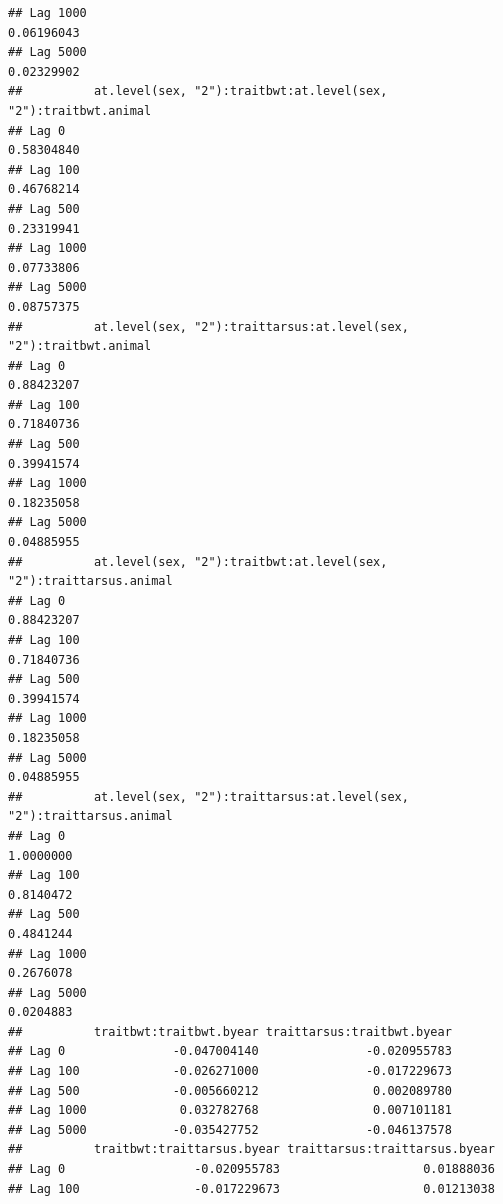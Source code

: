 \documentclass[
  12pt,
]{book}
\begin{document}
\begin{verbatim}
## Lag 1000                                                           0.06196043
## Lag 5000                                                           0.02329902
##          at.level(sex, "2"):traitbwt:at.level(sex, "2"):traitbwt.animal
## Lag 0                                                        0.58304840
## Lag 100                                                      0.46768214
## Lag 500                                                      0.23319941
## Lag 1000                                                     0.07733806
## Lag 5000                                                     0.08757375
##          at.level(sex, "2"):traittarsus:at.level(sex, "2"):traitbwt.animal
## Lag 0                                                           0.88423207
## Lag 100                                                         0.71840736
## Lag 500                                                         0.39941574
## Lag 1000                                                        0.18235058
## Lag 5000                                                        0.04885955
##          at.level(sex, "2"):traitbwt:at.level(sex, "2"):traittarsus.animal
## Lag 0                                                           0.88423207
## Lag 100                                                         0.71840736
## Lag 500                                                         0.39941574
## Lag 1000                                                        0.18235058
## Lag 5000                                                        0.04885955
##          at.level(sex, "2"):traittarsus:at.level(sex, "2"):traittarsus.animal
## Lag 0                                                               1.0000000
## Lag 100                                                             0.8140472
## Lag 500                                                             0.4841244
## Lag 1000                                                            0.2676078
## Lag 5000                                                            0.0204883
##          traitbwt:traitbwt.byear traittarsus:traitbwt.byear
## Lag 0               -0.047004140               -0.020955783
## Lag 100             -0.026271000               -0.017229673
## Lag 500             -0.005660212                0.002089780
## Lag 1000             0.032782768                0.007101181
## Lag 5000            -0.035427752               -0.046137578
##          traitbwt:traittarsus.byear traittarsus:traittarsus.byear
## Lag 0                  -0.020955783                    0.01888036
## Lag 100                -0.017229673                    0.01213038

\end{verbatim}
\end{document}
